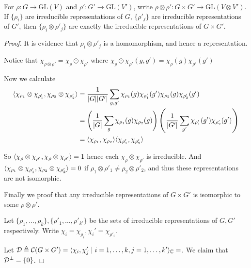 \begin{theorem}
For $\rho: G\to \text{GL}(V)$ and $\rho': G'\to \text{GL}(V')$, write
$\rho\otimes\rho' : G \times G' \to \text{GL}(V\otimes V')$.
If $\{ \rho_i \}$ are irreducible representations of $G$,
$\{ \rho'_j \}$ are irreducible representations of $G'$, then
$\{ \rho_i \otimes \rho'_j \}$ are exactly the irreducible
representations of $G \times G'$.

\begin{proof}
  It is evidence that $\rho_i \otimes \rho'_j$ is a homomorphism, and hence
  a representation.

  Notice that $\chi_{\rho \otimes \rho'} = \chi_\rho \odot \chi_{\rho'}$ where
  $\chi_\rho \odot \chi_{\rho'}(g, g') = \chi_\rho(g) \chi_{\rho'}(g')$

  Now we calculate
  \begin{align*}
    \langle\chi_{\rho_1} \otimes \chi_{\rho'_1}, \chi_{\rho_2} \otimes \chi_{\rho'_2}\rangle
    &= \frac{1}{\lvert G\rvert\lvert G'\rvert} \sum_{g, g'} \chi_{\rho_1}(g) \chi_{\rho'_1}(g')
    \chi_{\rho_2}(g) \chi_{\rho'_2}(g')  \\
    &= \left( \frac{1}{\lvert G\rvert} \sum_{g} \chi_{\rho_1}(g) \chi_{\rho_2}(g) \right)
    \left( \frac{1}{\lvert G'\rvert} \sum_{g'} \chi_{\rho'_1}(g') \chi_{\rho'_2}(g') \right) \\
    &= \langle\chi_{\rho_1}, \chi_{\rho_2}\rangle \langle\chi_{\rho'_1}, \chi_{\rho'_2}\rangle
  \end{align*}

  So $\langle\chi_{\rho} \otimes \chi_{\rho'}, \chi_{\rho} \otimes \chi_{\rho'}\rangle = 1$ hence
  each $\chi_{\rho} \otimes \chi_{\rho'}$ is irreducible.
  And $\langle\chi_{\rho_1} \otimes \chi_{\rho'_1}, \chi_{\rho_2} \otimes \chi_{\rho'_2}\rangle = 0$
  if $\rho_1 \otimes \rho'_1 \neq \rho_2 \otimes \rho'_2$, and thus these representations are
  not isomorphic.

  Finally we proof that any irreducible representations of $G\times G'$ is isomorphic to some
  $\rho \otimes \rho'$.

  Let $\{\rho_1,\dots,\rho_k\}, \{\rho'_1,\dots,\rho'_{k'}\}$ be the sets
  of irreducible representations of $G, G'$ respectively.
  Write $\chi_i = \chi_{\rho_i}, \chi_i' = \chi_{\rho'_i}$.

  Let $\mathcal{D} \triangleq \mathcal{C}(G\times G') = \langle\chi_i, \chi_j' \mid
    i = 1,\dots,k, j = 1,\dots,k'\rangle_{\mathbb{C}} = $. We claim that $\mathcal{D}^\perp = \{0\}$.


\end{proof}
\end{theorem}
